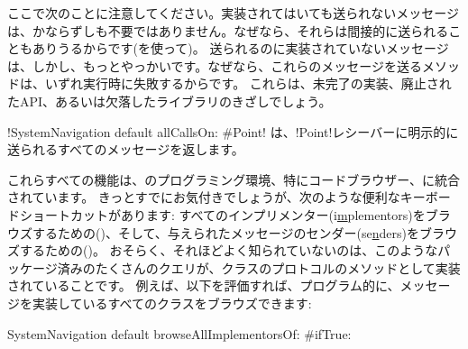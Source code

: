 \documentclass[a4paper,10pt,twoside]{book}
\begin{document}
ここで次のことに注意してください。実装されてはいても送られないメッセージは、かならずしも不要ではありません。なぜなら、それらは間接的に送られることもありうるからです(\eg{}を使って)。
送られるのに実装されていないメッセージは、しかし、もっとやっかいです。なぜなら、これらのメッセージを送るメソッドは、いずれ実行時に失敗するからです。
これらは、未完了の実装、廃止されたAPI、あるいは欠落したライブラリのきざしでしょう。

\ct!SystemNavigation default allCallsOn: #Point! は、\ct!Point!レシーバーに明示的に送られるすべてのメッセージを返します。

これらすべての機能は、\pharo{}のプログラミング環境、特にコードブラウザー、に統合されています。
きっとすでにお気付きでしょうが、次のような便利なキーボードショートカットがあります: すべてのインプリメンター(i\underline{m}plementors)をブラウズするための()、そして、与えられたメッセージのセンダー(se\underline{n}ders)をブラウズするための()。
おそらく、それほどよく知られていないのは、このようなパッケージ済みのたくさんのクエリが、クラスのプロトコルのメソッドとして実装されていることです。%
例えば、以下を評価すれば、プログラム的に、メッセージを実装しているすべてのクラスをブラウズできます:
\begin{code}{}
SystemNavigation default browseAllImplementorsOf: #ifTrue:
\end{code}
\end{document}
